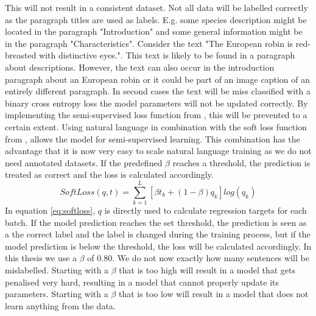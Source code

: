 \documentclass[a4paper, 12pt, oneside]{book} %
\begin{document}
This will not result in a consistent dataset.
Not all data will be labelled correctly as the paragraph titles are used as labels.
E.g. some species description might be located in the paragraph "Introduction" and some general information might be in the paragraph "Characteristics".
Consider the text "The European robin is red-breasted with distinctive eyes.".
This text is likely to be found in a paragraph about descriptions.
However, the text can also occur in the introduction paragraph about an European robin or it could be part of an image caption of an entirely different paragraph. 
In second cases the text will be miss classified with a binary cross entropy loss the model parameters will not be updated correctly. 
By implementing the semi-supervised loss function from \textcite{reed_training_2015}, this will be prevented to a certain extent.
Using natural language in combination with the soft loss function from \textcite{reed_training_2015}, allows the model for semi-supervised learning.
This combination has the advantage that it is now very easy to scale natural language training as we do not need annotated datasets.
If the predefined \(\beta\) reaches a threshold, the prediction is treated as correct and the loss is calculated accordingly.
\begin{equation} \label{eq:softloss}
 SoftLoss(q, t) = \sum_{k=1}^{L}[\beta t _k + (1- \beta )q _k]log(q _k)
\end{equation}
In equation \ref{eq:softloss}, \(q\) is directly used to calculate regression targets for each batch.
If the model prediction reaches the set threshold, the prediction is seen as a the correct label and the label is changed during the training process, but if the model prediction is below the threshold, the loss will be calculated accordingly.
In this thesis we use a \(\beta\) of 0.80. 
We do not now exactly how many sentences will be mislabelled.
Starting with a \(\beta\) that is too high will result in a model that gets penalised very hard, resulting in a model that cannot properly update its parameters.
Starting with a \(\beta\) that is too low will result in a model that does not learn anything from the data. 
\end{document}
